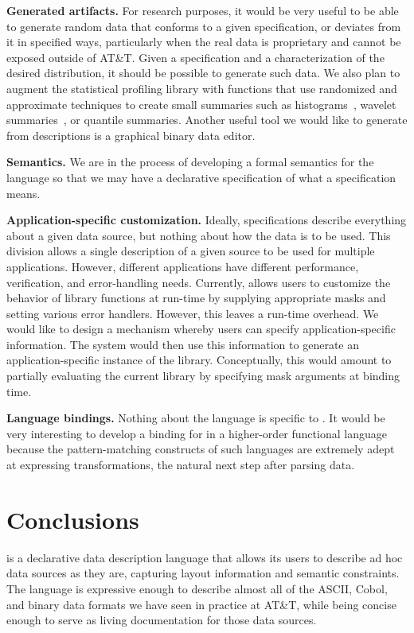 \documentclass[times]{acm-sigplan}
\begin{document}
\textbf{Generated artifacts.} 
For research purposes, it would be very useful to be able to generate random data that conforms to a given specification, or 
deviates from it in specified ways, particularly when the real data is proprietary and cannot be exposed outside of AT\&T. 
Given a \pads{} specification and a characterization of the desired distribution, it should be possible to generate such data.  We also plan to augment the statistical profiling library with
functions that use randomized and approximate techniques to create
small summaries such as histograms~\cite{histograms,histograms-wavelets}, wavelet summaries~\cite{histograms-wavelets},
or quantile summaries\cite{quantiles}.
Another useful tool we 
would like to generate from \pads{} descriptions is a graphical binary data editor. 

\textbf{Semantics.}  We are in the process of developing a formal semantics for the \pads{} language so that we may have a declarative specification of what a \pads{} specification means.

\textbf{Application-specific customization.}
Ideally, \pads{} specifications describe everything about a given
data source, but nothing about how the data is to be used. This
division allows a single description of a given source to be used
for multiple applications.  However, different applications have different
performance, verification, and error-handling needs.  Currently,
\pads{} allows users to customize the behavior of library
functions at run-time by supplying appropriate masks and setting various error handlers.  However, this leaves a run-time overhead.  We would like to 
design a mechanism whereby users can specify application-specific information.  The \pads{} system would then use this information to generate an 
application-specific instance of the library.  Conceptually, this would
amount to partially evaluating the current \pads{} library by specifying mask arguments at binding time.

\textbf{Language bindings.}  Nothing about the \pads{} language is specific to \C{}.  It would be very interesting to develop a binding for \pads{} in a higher-order functional language because the pattern-matching constructs of such languages are extremely adept at expressing transformations, the natural next step after parsing data.


\section{Conclusions}
\pads{} is a declarative data description language that allows 
its users to describe ad hoc data sources as they are, capturing
layout information and semantic constraints.  The language
is expressive enough to describe almost all of the ASCII, Cobol, 
and binary data formats we have seen in practice at AT\&T, while being 
concise enough to serve as living documentation for those data sources.  
\end{document}
